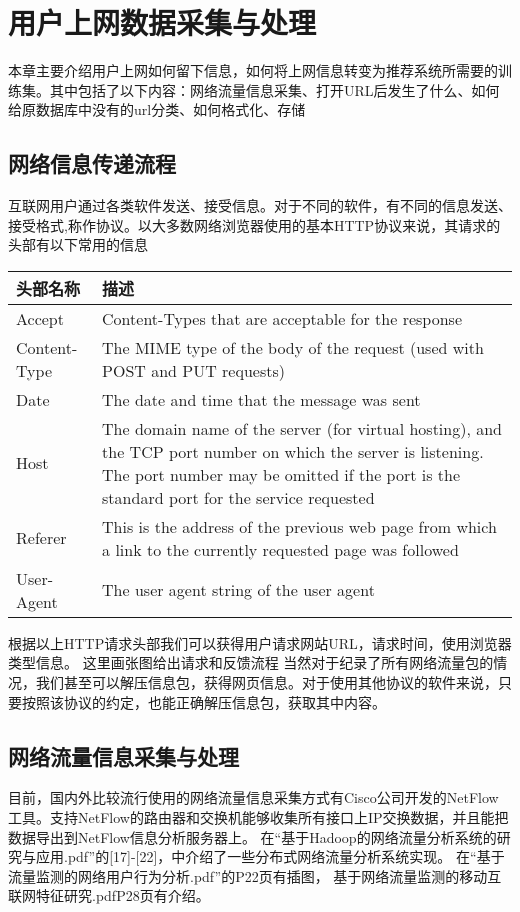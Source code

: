 \chapter{用户上网数据采集与处理}
本章主要介绍用户上网如何留下信息，如何将上网信息转变为推荐系统所需要的训练集。其中包括了以下内容：网络流量信息采集、打开URL后发生了什么、如何给原数据库中没有的url分类、如何格式化、存储
\section{网络信息传递流程}
互联网用户通过各类软件发送、接受信息。对于不同的软件，有不同的信息发送、接受格式,称作协议。以大多数网络浏览器使用的基本HTTP协议来说，其请求的头部有以下常用的信息 \\
\begin{center}
\begin{tabular}{l|p{10cm}}
 \hline
头部名称 & 描述 \\ \hline
Accept & Content-Types that are acceptable for the response \\ \hline
Content-Type & The MIME type of the body of the request (used with POST and PUT requests) \\ \hline
Date & The date and time that the message was sent \\ \hline
Host & The domain name of the server (for virtual hosting), and the TCP port number on which the server is listening. The port number may be omitted if the port is the standard port for the service requested \\ \hline
Referer & This is the address of the previous web page from which a link to the currently requested page was followed \\ \hline
User-Agent & The user agent string of the user agent \\
\hline
\end{tabular}
\end{center}
根据以上HTTP请求头部我们可以获得用户请求网站URL，请求时间，使用浏览器类型信息。
这里画张图给出请求和反馈流程
当然对于纪录了所有网络流量包的情况，我们甚至可以解压信息包，获得网页信息。对于使用其他协议的软件来说，只要按照该协议的约定，也能正确解压信息包，获取其中内容。
\section{网络流量信息采集与处理}
目前，国内外比较流行使用的网络流量信息采集方式有Cisco公司开发的NetFlow工具。支持NetFlow的路由器和交换机能够收集所有接口上IP交换数据，并且能把数据导出到NetFlow信息分析服务器上。
在“基于Hadoop的网络流量分析系统的研究与应用.pdf”的[17]-[22]，中介绍了一些分布式网络流量分析系统实现。
在“基于流量监测的网络用户行为分析.pdf”的P22页有插图，
基于网络流量监测的移动互联网特征研究.pdfP28页有介绍。

